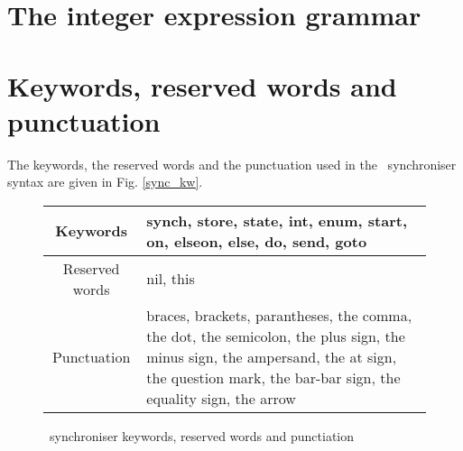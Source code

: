     \section{The integer expression grammar\label{int_exp_gr}}


    \section{Keywords, reserved words and punctuation\label{sync_kw}}
The keywords, the reserved words and the punctuation used in the \ak\ synchroniser syntax are given in Fig. \ref{sync_kw}.
\begin{figure}[h!]
\centering
\begin{tabular}{|c|p{}|}
\hline
Keywords & synch, store, state, int, enum, start, on, elseon, else, do, send, goto\\
\hline
Reserved words & nil, this\\
\hline
Punctuation & braces, brackets, parantheses, the comma, the dot, the semicolon, the plus sign, the minus sign, the ampersand, the at sign, the question mark, the bar-bar sign, the equality sign, the arrow\\
\hline
\end{tabular}
\caption{\ak\ synchroniser keywords, reserved words and punctiation}
\end{figure}
